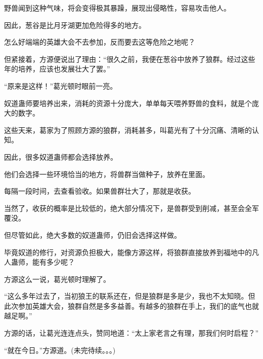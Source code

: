 \begin{this_body}
野兽闻到这种气味，将会变得极其暴躁，展现出侵略性，容易攻击他人。

因此，葱谷是比月牙湖更加危险得多的地方。

怎么好端端的英雄大会不去参加，反而要去这等危险之地呢？

但紧接着，方源便说出了理由：“很久之前，我便在葱谷中放养了狼群。经过这些年的培养，应该也发展壮大了罢。”

“原来是这样！”葛光顿时眼前一亮。

奴道蛊师要培养出来，消耗的资源十分庞大，单单每天喂养野兽的食料，就是个庞大的数字。

这些天来，葛家为了照顾方源的狼群，消耗甚多，叫葛光有了十分沉痛、清晰的认知。

因此，很多奴道蛊师都会选择放养。

他们会选择一些环境恰当的地方，将兽群当做种子，放养在里面。

每隔一段时间，去查看验收。如果兽群壮大了，那就是收获。

当然了，收获的概率是比较低的，绝大部分情况下，是兽群受到削减，甚至会全军覆没。

但尽管如此，绝大多数的奴道蛊师，仍旧会选择这样做。

毕竟奴道的修行，对资源负担极大，能像方源这样，将狼群直接放养到福地中的凡人蛊师，能有多少呢？

方源这么一说，葛光顿时理解了。

“这么多年过去了，当初狼王的联系还在，但是狼群是多是少，我也不太知晓。但此次参加英雄大会，狼群自然是多多益善。有越多的狼群在手上，我们的底气也就越足啊。”

方源的话，让葛光连连点头，赞同地道：“太上家老言之有理，那我们何时启程？”

“就在今日。”方源道。(未完待续。。。)

\end{this_body}

